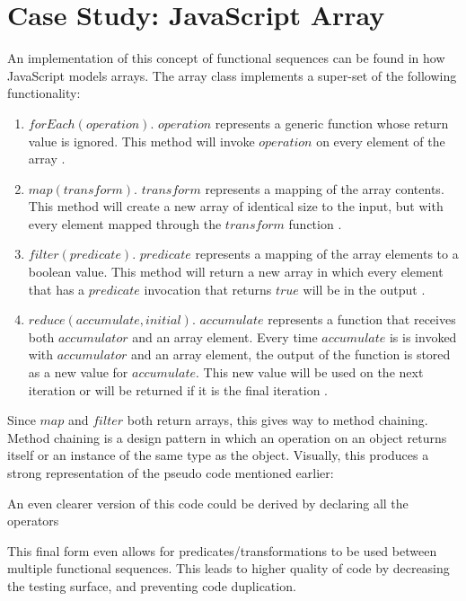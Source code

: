 \section{Case Study: JavaScript Array}

An implementation of this concept of functional sequences can be found in how JavaScript models arrays.  The array class implements a super-set of the following functionality:

\begin{enumerate}
  \item $forEach(operation)$.  $operation$ represents a generic function whose return value is ignored.  This method will invoke $operation$ on every element of the array \cite{TODO}.

  \item $map(transform)$.  $transform$ represents a mapping of the array contents.  This method will create a new array of identical size to the input, but with every element mapped through the $transform$ function \cite{TODO}.

  \item $filter(predicate)$.  $predicate$ represents a mapping of the array elements to a boolean value.  This method will return a new array in which every element that has a $predicate$ invocation that returns $true$ will be in the output \cite{TODO}.

  \item $reduce(accumulate, initial)$.  $accumulate$ represents a function that receives both $accumulator$ and an array element. Every time $accumulate$ is is invoked with $accumulator$ and an array element, the output of the function is stored as a new value for $accumulate$.  This new value will be used on the next iteration or will be returned if it is the final iteration \cite{TODO}.

\end{enumerate}

Since $map$ and $filter$ both return arrays, this gives way to method chaining. Method chaining is a design pattern in which an operation on an object returns itself or an instance of the same type as the object. Visually, this produces a strong representation of the pseudo code mentioned earlier:

\begin{minipage}{\linewidth}

\end{minipage} 

An even clearer version of this code could be derived by declaring all the operators

\begin{minipage}{\linewidth}

\end{minipage}

This final form even allows for predicates/transformations to be used between multiple functional sequences.  This leads to higher quality of code by decreasing the testing surface, and preventing code duplication. 